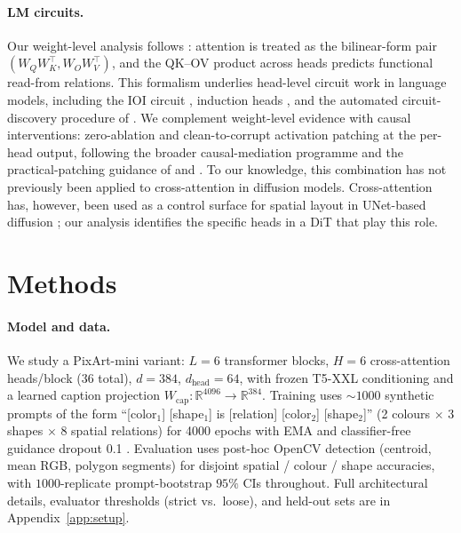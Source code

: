 \documentclass{article}
\begin{document}
\paragraph{LM circuits.}
Our weight-level analysis follows \citet{elhage2021mathematical}: attention is treated as the bilinear-form pair $(W_QW_K^\top, W_OW_V^\top)$, and the QK--OV product across heads predicts functional read-from relations. This formalism underlies head-level circuit work in language models, including the IOI circuit \citep{wang2023interpretability}, induction heads \citep{olsson2022induction}, and the automated circuit-discovery procedure of \citet{conmy2023acdc}. We complement weight-level evidence with causal interventions: zero-ablation and clean-to-corrupt activation patching at the per-head output, following the broader causal-mediation programme \citep{meng2022locating,geiger2021causal} and the practical-patching guidance of \citet{heimersheim2024patching} and \citet{zhang2024towards}. To our knowledge, this combination has not previously been applied to cross-attention in diffusion models. Cross-attention has, however, been used as a control surface for spatial layout in UNet-based diffusion \citep{chefer2023attend,hertz2023prompt}; our analysis identifies the specific heads in a DiT that play this role.

\section{Methods}

\paragraph{Model and data.}
We study a PixArt-mini \citep{chen2024pixart} variant: $L{=}6$ transformer blocks, $H{=}6$ cross-attention heads/block (36 total), $d{=}384$, $d_\text{head}{=}64$, with frozen T5-XXL conditioning \citep{raffel2020t5} and a learned caption projection $W_\text{cap}\!:\!\mathbb{R}^{4096}\!\to\!\mathbb{R}^{384}$. Training uses $\sim\!1000$ synthetic prompts of the form ``[color$_1$] [shape$_1$] is [relation] [color$_2$] [shape$_2$]'' (2 colours $\times$ 3 shapes $\times$ 8 spatial relations) for 4000 epochs with EMA and classifier-free guidance dropout 0.1 \citep{ho2022classifier}. Evaluation uses post-hoc OpenCV detection (centroid, mean RGB, polygon segments) for disjoint spatial / colour / shape accuracies, with $1000$-replicate prompt-bootstrap $95\%$ CIs throughout. Full architectural details, evaluator thresholds (strict vs.\ loose), and held-out sets are in Appendix~\ref{app:setup}.
\end{document}
